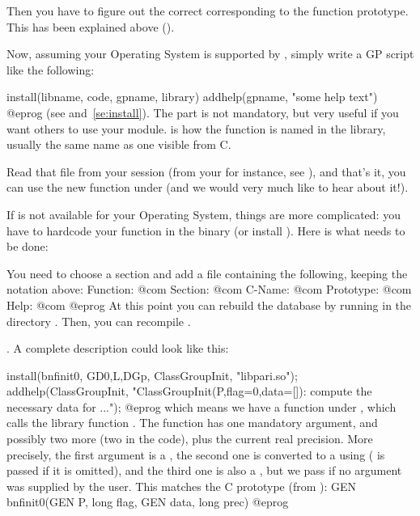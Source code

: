 Then you have to figure out the correct  corresponding to
the function prototype. This has been explained above
().

Now, assuming your Operating System is supported by , simply
write a GP script like the following:

\bprog
install(libname, code, gpname, library)
addhelp(gpname, "some help text")
@eprog
\noindent(see  and~\ref{se:install}). The 
part is not mandatory, but very useful if you want others to use your
module.   is how the function is named in the library,
usually the same name as one visible from C.

Read that file from your  session (from your  for
instance, see ), and that's it, you can use the new
function  under  (and we would very much like to hear about
it!).


If  is not available for your Operating System, things are more
complicated: you have to hardcode your function in the  binary (or
install ). Here is what needs to be done: 

You need to choose a section and add a file
containing the following, keeping the notation above:
\bprog
Function:  @com
Section:   @com
C-Name:    @com
Prototype: @com
Help:      @com
@eprog
\noindent At this point you can rebuild the database by running  in the directory . Then, you can recompile .

.
%
A complete description could look like this:

\bprog
{
  install(bnfinit0, GD0,L,DGp, ClassGroupInit, "libpari.so");
  addhelp(ClassGroupInit, "ClassGroupInit(P,{flag=0},{data=[]}):
    compute the necessary data for ...");
}
@eprog
\noindent which means we have a function  under , which
calls the library function  . The function has one mandatory
argument, and possibly two more (two  in the code), plus the current
real precision. More precisely, the first argument is a , the second
one is converted to a  using  ( is passed if it is
omitted), and the third one is also a , but we pass  if no
argument was supplied by the user. This matches the C prototype (from
):
%
\bprog
  GEN bnfinit0(GEN P, long flag, GEN data, long prec)
@eprog

